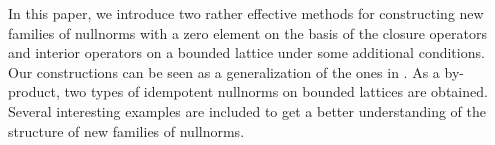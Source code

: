 
In this paper, we introduce two rather effective methods for constructing new families of nullnorms
with a zero element on the basis of the closure operators and interior operators on a
bounded lattice under some additional conditions. Our constructions can be seen as a
generalization of the ones in \cite{wang}. As a by-product, two types of idempotent nullnorms
on bounded lattices are obtained. Several interesting examples are included to get a better
understanding of the structure of new families of nullnorms.


